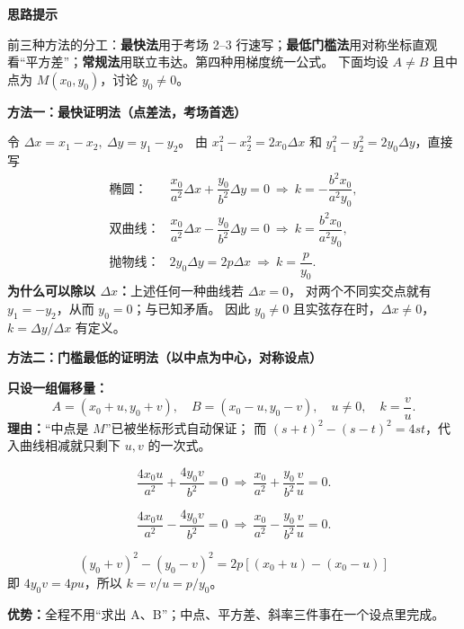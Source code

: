 \clearpage
\begin{proofbox}
\textbf{\textcolor{CProof}{思路提示}}

前三种方法的分工：\textbf{最快法}用于考场 2--3 行速写；\textbf{最低门槛法}用对称坐标直观看“平方差”；\textbf{常规法}用联立韦达。第四种用梯度统一公式。
下面均设 $A\ne B$ 且中点为 $M(x_0,y_0)$，讨论 $y_0\ne0$。

\medskip
\textbf{\textcolor{CProof}{方法一：最快证明法（点差法，考场首选）}}
\begin{center}\end{center}

令 $\Delta x=x_1-x_2,\ \Delta y=y_1-y_2$。
由 $x_1^2-x_2^2=2x_0\Delta x$ 和 $y_1^2-y_2^2=2y_0\Delta y$，直接写
\[
\begin{array}{ll}
\text{椭圆：}&\dfrac{x_0}{a^2}\Delta x+\dfrac{y_0}{b^2}\Delta y=0
\ \Longrightarrow\ \boxed{k=-\dfrac{b^2x_0}{a^2y_0}},\\[9pt]
\text{双曲线：}&\dfrac{x_0}{a^2}\Delta x-\dfrac{y_0}{b^2}\Delta y=0
\ \Longrightarrow\ \boxed{k=\dfrac{b^2x_0}{a^2y_0}},\\[9pt]
\text{抛物线：}&2y_0\Delta y=2p\Delta x
\ \Longrightarrow\ \boxed{k=\dfrac{p}{y_0}}.
\end{array}
\]
\textbf{为什么可以除以 $\Delta x$：}上述任何一种曲线若 $\Delta x=0$，
对两个不同实交点就有 $y_1=-y_2$，从而 $y_0=0$；与已知矛盾。
因此 $y_0\ne0$ 且实弦存在时，$\Delta x\ne0$，$k=\Delta y/\Delta x$ 有定义。

\tcbbreak
\textbf{\textcolor{CProof}{方法二：门槛最低的证明法（以中点为中心，对称设点）}}
\begin{center}\end{center}

\textbf{只设一组偏移量：}
\[
 A=(x_0+u,y_0+v),\quad B=(x_0-u,y_0-v),\quad u\ne0,\quad k=\frac vu.
\]
\textbf{理由：}“中点是 $M$”已被坐标形式自动保证；
而 $(s+t)^2-(s-t)^2=4st$，代入曲线相减就只剩下 $u,v$ 的一次式。
\begin{description}[style=nextline,leftmargin=2.8em,labelsep=0.5em,itemsep=0.45em]
\item[\textbf{椭圆：}]
\[
\frac{4x_0u}{a^2}+\frac{4y_0v}{b^2}=0
\ \Longrightarrow\ \frac{x_0}{a^2}+\frac{y_0}{b^2}\frac vu=0.
\]
\item[\textbf{双曲线：}]
\[
\frac{4x_0u}{a^2}-\frac{4y_0v}{b^2}=0
\ \Longrightarrow\ \frac{x_0}{a^2}-\frac{y_0}{b^2}\frac vu=0.
\]
\item[\textbf{抛物线：}]
\[
(y_0+v)^2-(y_0-v)^2=2p[(x_0+u)-(x_0-u)]
\]
即 $4y_0v=4pu$，所以 $k=v/u=p/y_0$。
\end{description}
\textbf{优势：}全程不用“求出 A、B”；中点、平方差、斜率三件事在一个设点里完成。


\end{proofbox}
